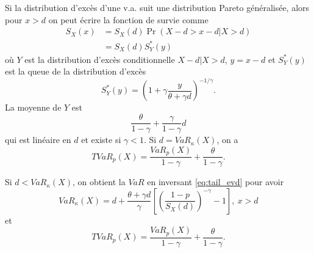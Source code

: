 Si la distribution d'excès d'une v.a. suit une distribution Pareto généralisée, alors pour $x>d$ on peut écrire la fonction de survie comme
\begin{align}
S_X(x) &= S_X(d) \Pr(X-d > x- d \vert X > d)\nonumber\\
&= S_X(d) S_{Y}^*(y)\label{eq:tail_evd}
\end{align}
où $Y$ est la distribution d'excès conditionnelle $X-d\vert X>d$, $y = x-d$ et $S_Y^*(y)$ est la queue de la distribution d'excès
$$S_Y^*(y) = \left(1 + \gamma \frac{y}{\theta + \gamma d}\right)^{-1/\gamma}.$$
La moyenne de $Y$ est 
$$\frac{\theta}{1-\gamma} + \frac{\gamma}{1 - \gamma}d$$
qui est linéaire en $d$ et existe si $\gamma < 1$. Si $d = VaR_\kappa(X)$, on a 
$$TVaR_p(X) = \frac{VaR_p(X)}{1-\gamma} + \frac{\theta}{1 - \gamma}.$$

Si $d < VaR_\kappa(X)$, on obtient la $VaR$ en inversant \eqref{eq:tail_evd} pour avoir 
$$VaR_\kappa(X) = d + \frac{\theta + \gamma d}{\gamma} \left[ \left( \frac{1 - p}{S_X(d)}\right)^{-\gamma} - 1\right], ~ x > d$$
et
$$TVaR_p(X) = \frac{VaR_p(X)}{1-\gamma} + \frac{\theta}{1 - \gamma}.$$


